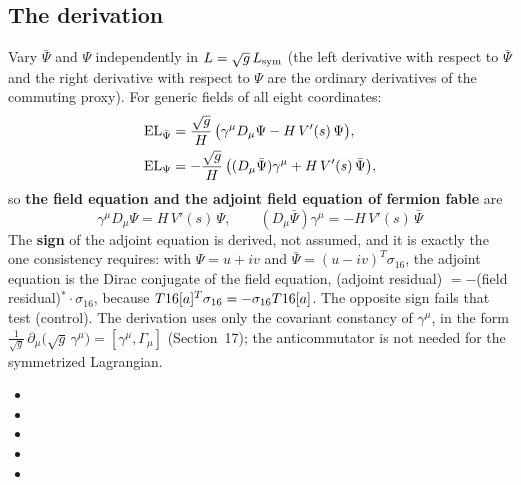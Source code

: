 \subsection{The derivation}
\label{sec:5.1}

Vary $\bar\Psi$ and $\Psi$ independently in $L=\sqrt g\,L_{\mathrm{sym}}$ (the left derivative with respect to
$\bar\Psi$ and the right derivative with respect to $\Psi$ are the ordinary derivatives of the
commuting proxy). For generic fields of all eight coordinates:
\begin{align*}
  \mathrm{EL}_{\bar\Psi} &= \frac{\sqrt g}{H}\,\bigl(\gamma^\mu D_\mu\Psi-H\,V'(s)\,\Psi\bigr),\\
  \mathrm{EL}_{\Psi} &= -\frac{\sqrt g}{H}\,\bigl((D_\mu\bar\Psi)\gamma^\mu+H\,V'(s)\,\bar\Psi\bigr),
\end{align*}
so \textbf{the field equation and the adjoint field equation of fermion fable} are
\[
  \boxed{\;\gamma^\mu D_\mu\Psi=H\,V'(s)\,\Psi,\qquad (D_\mu\bar\Psi)\gamma^\mu=-H\,V'(s)\,\bar\Psi\;}
\]
The \textbf{sign} of the adjoint equation is derived, not assumed, and it is exactly the one
consistency requires: with $\Psi=u+iv$ and $\bar\Psi=(u-iv)^{T}\sigma_{16}$, the adjoint equation is
the Dirac conjugate of the field equation, (adjoint residual) $=-$(field residual)${}^{*}\cdot\sigma_{16}$,
because $T16[a]^{T}\sigma_{16}=-\sigma_{16}T16[a]$. The opposite sign fails that test (control).
The derivation uses only the covariant constancy of $\gamma^\mu$, in the form
$\frac{1}{\sqrt g}\,\partial_\mu\bigl(\sqrt g\,\gamma^\mu\bigr)=[\gamma^\mu,\Gamma_\mu]$ (Section~17);
the anticommutator is not needed for the symmetrized Lagrangian. 
\begin{itemize}
  \item {}
  \item {}
  \item {}
  \item {}
  \item {}
\end{itemize}

